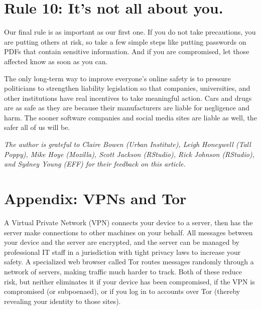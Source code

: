 \documentclass[10pt,letterpaper]{article}
\newcommand{\rulemajor}[1]{\section*{#1}}
\begin{document}
\rulemajor{Rule 10: It's not all about you.}

Our final rule is as important as our first one.
If you do not take precautions,
you are putting others at risk,
so take a few simple steps like putting passwords on PDFs that contain sensitive information.
And if you are compromised,
let those affected know as soon as you can.

The only long-term way to improve everyone's online safety
is to pressure politicians to strengthen liability legislation
so that companies, universities, and other institutions have real incentives to take meaningful action.
Cars and drugs are as safe as they are because their manufacturers are liable for negligence and harm.
The sooner software companies and social media sites are liable as well,
the safer all of us will be.

\emph{
  The author is grateful to Claire Bowen (Urban Institute),
  Leigh Honeywell (Tall Poppy),
  Mike Hoye (Mozilla),
  Scott Jackson (RStudio),
  Rick Johnson (RStudio),
  and Sydney Young (EFF)
  for their feedback on this article.
}

\nocite{*}


\section*{Appendix: VPNs and Tor}
  
A Virtual Private Network (VPN) connects your device to a server,
then has the server make connections to other machines on your behalf.
All messages between your device and the server are encrypted,
and the server can be managed by professional IT staff
in a jurisdiction with tight privacy laws
to increase your safety.
A specialized web browser called Tor routes messages randomly through a network of servers,
making traffic much harder to track.
Both of these reduce risk,
but neither eliminates it
if your device has been compromised,
if the VPN is compromised (or subpoenaed),
or if you log in to accounts over Tor
(thereby revealing your identity to those sites).
\end{document}
